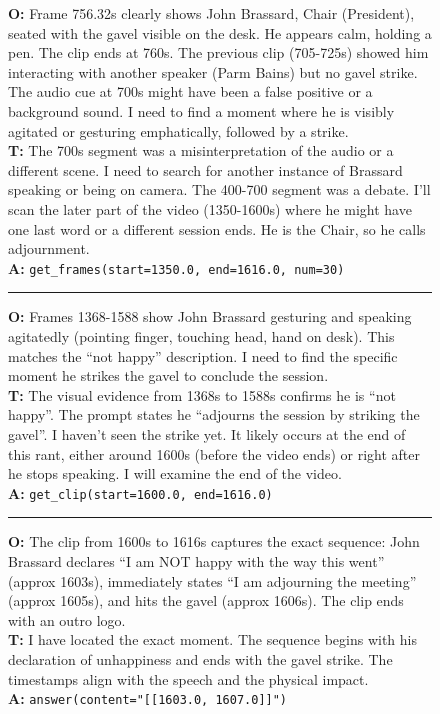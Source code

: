 \documentclass{article}
\theoremstyle{plain}
\theoremstyle{definition}
\theoremstyle{remark}
\begin{document}
\begin{figure}[!ht]
\begin{minipage}{0.95\textwidth}
    \textbf{O:} Frame 756.32s clearly shows John Brassard, Chair (President), seated with the gavel visible on the desk. He appears calm, holding a pen. The clip ends at 760s. The previous clip (705-725s) showed him interacting with another speaker (Parm Bains) but no gavel strike. The audio cue at 700s might have been a false positive or a background sound. I need to find a moment where he is visibly agitated or gesturing emphatically, followed by a strike.\\
    \textbf{T:} The 700s segment was a misinterpretation of the audio or a different scene. I need to search for another instance of Brassard speaking or being on camera. The 400-700 segment was a debate. I'll scan the later part of the video (1350-1600s) where he might have one last word or a different session ends. He is the Chair, so he calls adjournment.\\
    \textbf{A:} \texttt{get\_frames(start=1350.0, end=1616.0, num=30)}

    \vspace{0.2em}\hrule\vspace{0.2em}

    \textbf{O:} Frames 1368-1588 show John Brassard gesturing and speaking agitatedly (pointing finger, touching head, hand on desk). This matches the ``not happy'' description. I need to find the specific moment he strikes the gavel to conclude the session.\\
    \textbf{T:} The visual evidence from 1368s to 1588s confirms he is ``not happy''. The prompt states he ``adjourns the session by striking the gavel''. I haven't seen the strike yet. It likely occurs at the end of this rant, either around 1600s (before the video ends) or right after he stops speaking. I will examine the end of the video.\\
    \textbf{A:} \texttt{get\_clip(start=1600.0, end=1616.0)}

    \vspace{0.2em}\hrule\vspace{0.2em}

    \textbf{O:} The clip from 1600s to 1616s captures the exact sequence: John Brassard declares ``I am NOT happy with the way this went'' (approx 1603s), immediately states ``I am adjourning the meeting'' (approx 1605s), and hits the gavel (approx 1606s). The clip ends with an outro logo.\\
    \textbf{T:} I have located the exact moment. The sequence begins with his declaration of unhappiness and ends with the gavel strike. The timestamps align with the speech and the physical impact.\\
    \textbf{A:} \texttt{answer(content="[[1603.0, 1607.0]]")}


\end{minipage}
\end{figure}
\end{document}
